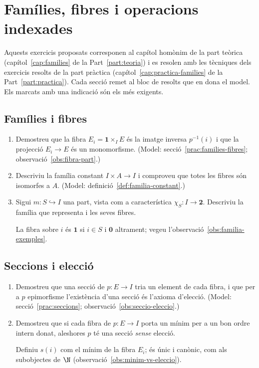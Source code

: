 \chapter{Famílies, fibres i operacions indexades}\label{cap:exercicis-families}

Aquests exercicis proposats corresponen al capítol homònim de la part teòrica (capítol~\ref{cap:families} de la Part~\ref{part:teoria}) i es resolen amb les tècniques dels exercicis resolts de la part pràctica (capítol~\ref{cap:practica-families} de la Part~\ref{part:practica}). Cada secció remet al bloc de resolts que en dona el model. Els marcats amb una indicació són els més exigents.

\section{Famílies i fibres}

\begin{enumerate}
  \item Demostreu que la fibra \(E_i=\mathbf1\times_I E\) és la imatge inversa \(p^{-1}(i)\) i que la projecció \(E_i\to E\) és un monomorfisme. (Model: secció~\ref{prac:families-fibres}; observació~\ref{obs:fibra-part}.)

  \item Descriviu la família constant \(I\times A\to I\) i comproveu que totes les fibres són isomorfes a \(A\). (Model: definició~\ref{def:familia-constant}.)

  \item Sigui \(m\colon S\hookrightarrow I\) una part, vista com a característica \(\chi_S\colon I\to\mathbf2\). Descriviu la família que representa i les seves fibres. \begin{indicacio}La fibra sobre \(i\) és \(\mathbf1\) si \(i\in S\) i \(\mathbf0\) altrament; vegeu l'observació~\ref{obs:familia-exemples}.\end{indicacio}
\end{enumerate}

\section{Seccions i elecció}

\begin{enumerate}[resume]
  \item Demostreu que una secció de \(p\colon E\to I\) tria un element de cada fibra, i que per a \(p\) epimorfisme l'existència d'una secció és l'axioma d'elecció. (Model: secció~\ref{prac:seccions}; observació~\ref{obs:seccio-eleccio}.)

  \item Demostreu que si cada fibra de \(p\colon E\to I\) porta un mínim per a un bon ordre intern donat, aleshores \(p\) té una secció \emph{sense} elecció. \begin{indicacio}Definiu \(s(i)\) com el mínim de la fibra \(E_i\); és únic i canònic, com als subobjectes de \(\N\) (observació~\ref{obs:minim-vs-eleccio}).\end{indicacio}
\end{enumerate}

